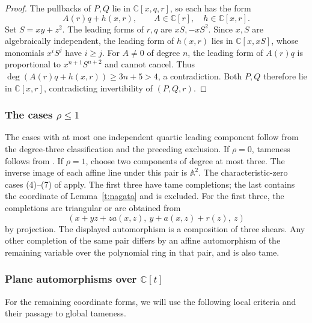 \documentclass[11pt,reqno]{amsart}
\numberwithin{equation}{section}
\theoremstyle{plain}
\theoremstyle{definition}
\theoremstyle{remark}
\newcommand{\C}{\mathbb C}
\newcommand{\A}{\mathbb A}
\begin{document}
\begin{proof}
The pullbacks of $P,Q$ lie in $\C[x,q,r]$, so each has the form
\[
 A(r)q+h(x,r),\qquad A\in\C[r],\quad h\in\C[x,r].
\]
Set $S=xy+z^2$. The leading forms of $r,q$ are $xS,-xS^2$.
Since $x,S$ are algebraically independent, the leading form of $h(x,r)$
lies in $\C[x,xS]$, whose monomials $x^iS^j$ have $i\ge j$.
For $A\ne0$ of degree $n$, the leading form of $A(r)q$ is proportional to
$x^{n+1}S^{n+2}$ and cannot cancel. Thus
$\deg(A(r)q+h(x,r))\ge3n+5>4$, a contradiction.
Both $P,Q$ therefore lie in $\C[x,r]$, contradicting invertibility of $(P,Q,r)$.
\end{proof}

\subsubsection{The cases \texorpdfstring{$\rho\le1$}{rho at most one}}\label{t:smallpair}
The cases with at most one independent quartic leading component follow
from the degree-three classification and the preceding exclusion.
If $\rho=0$, tameness follows from \cite[Corollary~3.9.5]{BVS}.
If $\rho=1$, choose two components of degree at most three. The inverse image
of each affine line under this pair is $\A^2$. The characteristic-zero cases
(4)--(7) of \cite[Theorem 3]{BVS} apply. The first three have tame completions;
the last contains the coordinate of Lemma~\ref{t:nagata} and is excluded.
For the first three, the completions are triangular or are obtained from
\[
 (x+yz+za(x,z),\ y+a(x,z)+r(z),\ z)
\]
by projection. The displayed automorphism is a composition of three shears.
Any other completion of the same pair differs by an affine automorphism of
the remaining variable over the polynomial ring in that pair, and is also tame.

\subsubsection{Plane automorphisms over \texorpdfstring{$\C[t]$}{C[t]}}
For the remaining coordinate forms, we will use the following local
criteria and their passage to global tameness.
\end{document}
